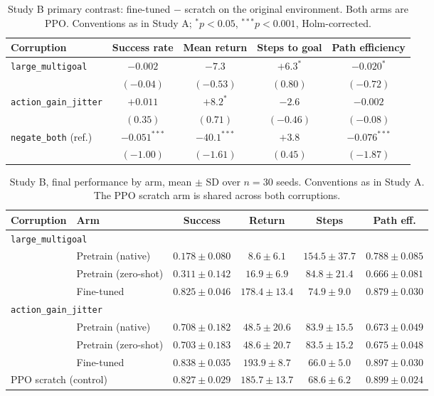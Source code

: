 \begin{table}[htbp]
\centering
\setlength{\tabcolsep}{4pt}
\caption{Study B primary contrast: fine-tuned $-$ scratch on the original
environment. Both arms are PPO. Conventions as in Study A;
${}^{*}p<0.05$, ${}^{***}p<0.001$, Holm-corrected.}
\small
\begin{tabular}{lcccc}
\toprule
Corruption & Success rate & Mean return & Steps to goal & Path efficiency \\
\midrule
\texttt{large\_multigoal} & $-0.002$ & $-7.3$ & $+6.3^{*}$ & $-0.020^{*}$ \\
 & \footnotesize$(-0.04)$ & \footnotesize$(-0.53)$ & \footnotesize$(0.80)$ & \footnotesize$(-0.72)$ \\[3pt]
\texttt{action\_gain\_jitter} & $+0.011$ & $+8.2^{*}$ & $-2.6$ & $-0.002$ \\
 & \footnotesize$(0.35)$ & \footnotesize$(0.71)$ & \footnotesize$(-0.46)$ & \footnotesize$(-0.08)$ \\[3pt]
\texttt{negate\_both} (ref.) & $-0.051^{***}$ & $-40.1^{***}$ & $+3.8$ & $-0.076^{***}$ \\
 & \footnotesize$(-1.00)$ & \footnotesize$(-1.61)$ & \footnotesize$(0.45)$ & \footnotesize$(-1.87)$ \\
\bottomrule
\end{tabular}
\end{table}

\begin{table}[htbp]
\centering
\setlength{\tabcolsep}{4pt}
\caption{Study B, final performance by arm, mean $\pm$ SD over $n=30$ seeds.
Conventions as in Study A. The PPO scratch arm is shared across both
corruptions.}
\small
\begin{tabular}{llcccc}
\toprule
Corruption & Arm & Success & Return & Steps & Path eff. \\
\midrule
\multicolumn{6}{l}{\texttt{large\_multigoal}} \\
 & Pretrain (native)    & $0.178 \pm 0.080$ & $8.6 \pm 6.1$ & $154.5 \pm 37.7$ & $0.788 \pm 0.085$ \\
 & Pretrain (zero-shot) & $0.311 \pm 0.142$ & $16.9 \pm 6.9$ & $84.8 \pm 21.4$ & $0.666 \pm 0.081$ \\
 & Fine-tuned           & $0.825 \pm 0.046$ & $178.4 \pm 13.4$ & $74.9 \pm 9.0$ & $0.879 \pm 0.030$ \\
\midrule
\multicolumn{6}{l}{\texttt{action\_gain\_jitter}} \\
 & Pretrain (native)    & $0.708 \pm 0.182$ & $48.5 \pm 20.6$ & $83.9 \pm 15.5$ & $0.673 \pm 0.049$ \\
 & Pretrain (zero-shot) & $0.703 \pm 0.183$ & $48.6 \pm 20.7$ & $83.5 \pm 15.2$ & $0.675 \pm 0.048$ \\
 & Fine-tuned           & $0.838 \pm 0.035$ & $193.9 \pm 8.7$ & $66.0 \pm 5.0$ & $0.897 \pm 0.030$ \\
\midrule
\multicolumn{2}{l}{PPO scratch (control)} & $0.827 \pm 0.029$ & $185.7 \pm 13.7$ & $68.6 \pm 6.2$ & $0.899 \pm 0.024$ \\
\bottomrule
\end{tabular}
\end{table}

